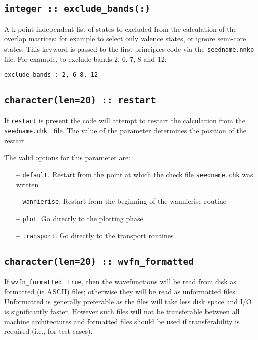 \subsection[exclude\_bands]{\tt integer :: exclude\_bands(:)}

A k-point independent list of states to excluded from the calculation
 of the overlap matrices;
 for example to select only valence states, or ignore semi-core states.
 This keyword is passed to the first-principles code via the
 {\tt seedname.nnkp} file. For example, to exclude bands 2, 6, 7, 8
 and 12:

 \verb#exclude_bands : 2, 6-8, 12#

\subsection[restart]{\tt character(len=20) :: restart}

If \verb#restart# is present the code will attempt to restart the calculation
from the {\tt seedname.chk } file. The value of the parameter
determines the position of the restart

The valid options for this parameter are:
\begin{itemize}
\item[{\bf --}]  \verb#default#. Restart from the point at which the
  check file {\tt seedname.chk} was written
\item[{\bf --}]  \verb#wannierise#. Restart from the beginning of the
  wannierise routine
\item[{\bf --}]  \verb#plot#. Go directly to the plotting phase
\item[{\bf --}]  \verb#transport#. Go directly to the transport routines


\end{itemize}



\subsection[wvfn\_formated]{\tt character(len=20) :: wvfn\_formatted}

If \verb#wvfn_formatted#=\verb#true#, then the wavefunctions will be
read from disk as formatted (ie ASCII) files; otherwise they will be
read as unformatted files. Unformatted is generally preferable as the
files will take less disk space and I/O is significantly
faster. However such files will not be transferable between all
machine architectures and formatted files should be used if
transferability is required (i.e., for test cases).

